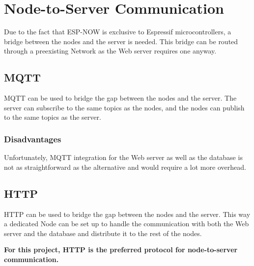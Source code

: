 \section{Node-to-Server Communication}
Due to the fact that ESP-NOW is exclusive to Espressif microcontrollers,
a bridge between the nodes and the server is needed. This bridge can be 
routed through a preexisting Network as the Web server requires 
one anyway.

    \subsection{MQTT}
    MQTT can be used to bridge the gap between the nodes and the server.
    The server can subscribe to the same topics as the nodes, and the nodes
    can publish to the same topics as the server.

        \subsubsection{Disadvantages}
        Unfortunately, MQTT integration for the Web server as well as the database
        is not as straightforward as the alternative and would require a lot more 
        overhead.

    \subsection{HTTP}
    HTTP can be used to bridge the gap between the nodes and the server.
    This way a dedicated Node can be set up to handle the communication
    with both the Web server and the database and distribute it to the 
    rest of the nodes.

    \vspace{1cm}
    \textbf{For this project, HTTP is the preferred protocol for 
    node-to-server communication.}



